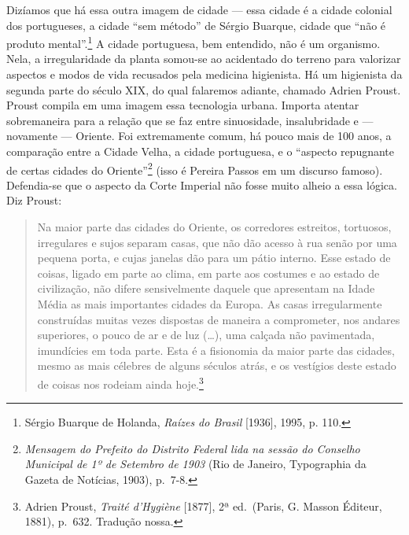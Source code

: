 Dizíamos que há essa outra imagem de cidade --- essa cidade é a cidade
colonial dos portugueses, a cidade ``sem método'' de Sérgio Buarque,
cidade que ``não é produto mental''.\footnote{Sérgio Buarque de Holanda,
  \textit{Raízes do Brasil} {[}1936{]}, 1995, p. 110.} A cidade
portuguesa, bem entendido, não é um organismo. Nela, a irregularidade da
planta somou-se ao acidentado do terreno para valorizar aspectos e modos
de vida recusados pela medicina higienista. Há um higienista da segunda
parte do século XIX, do qual falaremos adiante, chamado Adrien Proust.
Proust compila em uma imagem essa tecnologia urbana. Importa atentar
sobremaneira para a relação que se faz entre sinuosidade, insalubridade
e --- novamente --- Oriente. Foi extremamente comum, há pouco mais de 100
anos, a comparação entre a Cidade Velha, a cidade portuguesa, e o
``aspecto repugnante de certas cidades do Oriente''\footnote{\textit{Mensagem
  do Prefeito do Distrito Federal lida na sessão do Conselho Municipal
  de 1º de Setembro de 1903} (Rio de Janeiro, Typographia da Gazeta de
  Notícias, 1903), p.~7-8.} (isso é Pereira Passos em um discurso
famoso). Defendia-se que o aspecto da Corte Imperial não fosse muito
alheio a essa lógica. Diz Proust:

\begin{quote}
Na maior parte das cidades do Oriente, os corredores estreitos,
tortuosos, irregulares e sujos separam casas, que não dão acesso à rua
senão por uma pequena porta, e cujas janelas dão para um pátio interno.
Esse estado de coisas, ligado em parte ao clima, em parte aos costumes e
ao estado de civilização, não difere sensivelmente daquele que
apresentam na Idade Média as mais importantes cidades da Europa. As
casas irregularmente construídas muitas vezes dispostas de maneira a
comprometer, nos andares superiores, o pouco de ar e de luz (\ldots{}),
uma calçada não pavimentada, imundícies em toda parte. Esta é a
fisionomia da maior parte das cidades, mesmo as mais célebres de alguns
séculos atrás, e os vestígios deste estado de coisas nos rodeiam ainda
hoje.\footnote{Adrien Proust, \textit{Traité d'Hygiène} {[}1877{]}, 2ª
  ed.~(Paris, G. Masson Éditeur, 1881), p.~632. Tradução nossa.}
\end{quote}

